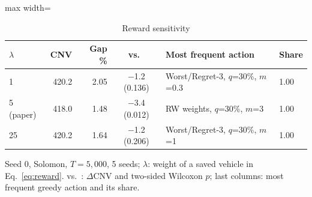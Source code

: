 \begin{table}[t]
\centering
\caption{Reward sensitivity}\label{tab:reward}
\setlength{\tabcolsep}{3pt}
\begin{adjustbox}{max width=\linewidth}
\begin{tabular}{lrrcll}
\toprule
$\lambda$ & CNV & Gap \% & vs.\ \Rw{} & Most frequent action & Share\\ \midrule
1 & 420.2 & 2.05 & $-$1.2 (0.136) & Worst/Regret-3, $q$=30\%, $m$=0.3 & 1.00\\
5 (paper) & 418.0 & 1.48 & $-$3.4 (0.012) & RW weights, $q$=30\%, $m$=3 & 1.00\\
25 & 420.2 & 1.64 & $-$1.2 (0.206) & Worst/Regret-3, $q$=30\%, $m$=1 & 1.00\\
\bottomrule
\end{tabular}
\end{adjustbox}
\par\vspace{2pt}\parbox{\linewidth}{\footnotesize Seed 0, Solomon, $T=5{,}000$, 5 seeds; $\lambda$: weight of a saved vehicle in Eq.~\eqref{eq:reward}. vs.\ \Rw{}: $\Delta$CNV and two-sided Wilcoxon $p$; last columns: most frequent greedy action and its share.}
\end{table}
